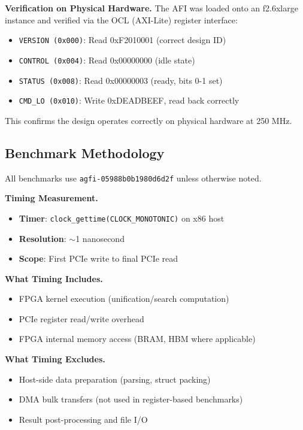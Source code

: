 \documentclass[11pt,a4paper]{article}
\begin{document}
\textbf{Verification on Physical Hardware.}
The AFI was loaded onto an f2.6xlarge instance and verified via the OCL
(AXI-Lite) register interface:

\begin{itemize}
  \item \texttt{VERSION (0x000)}: Read 0xF2010001 (correct design ID)
  \item \texttt{CONTROL (0x004)}: Read 0x00000000 (idle state)
  \item \texttt{STATUS (0x008)}: Read 0x00000003 (ready, bits 0-1 set)
  \item \texttt{CMD\_LO (0x010)}: Write 0xDEADBEEF, read back correctly
\end{itemize}

This confirms the design operates correctly on physical hardware at 250 MHz.

\subsection{Benchmark Methodology}
\label{subsec:methodology_chirho}

All benchmarks use \texttt{agfi-05988b0b1980d6d2f} unless otherwise noted.

\textbf{Timing Measurement.}
\begin{itemize}
  \item \textbf{Timer}: \texttt{clock\_gettime(CLOCK\_MONOTONIC)} on x86 host
  \item \textbf{Resolution}: $\sim$1 nanosecond
  \item \textbf{Scope}: First PCIe write to final PCIe read
\end{itemize}

\textbf{What Timing Includes.}
\begin{itemize}
  \item FPGA kernel execution (unification/search computation)
  \item PCIe register read/write overhead
  \item FPGA internal memory access (BRAM, HBM where applicable)
\end{itemize}

\textbf{What Timing Excludes.}
\begin{itemize}
  \item Host-side data preparation (parsing, struct packing)
  \item DMA bulk transfers (not used in register-based benchmarks)
  \item Result post-processing and file I/O
\end{itemize}
\end{document}
